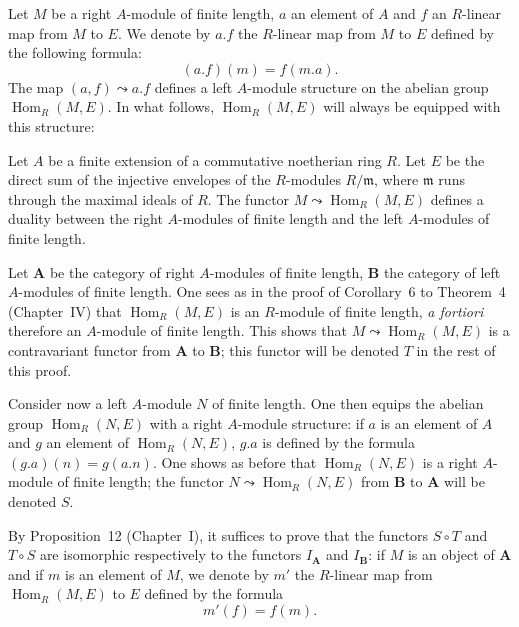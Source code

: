 Let $M$ be a right $A$-module of finite length, $a$ an element of $A$
and $f$ an $R$-linear map from $M$ to $E$. We denote by $a.f$ the
$R$-linear map from $M$ to $E$ defined by the following formula:
\[
(a.f)(m)=f(m.a).
\]
The map $(a,f)\leadsto a.f$ defines a left $A$-module structure on the
abelian group $\operatorname{Hom}_R(M,E)$. In what follows,
$\operatorname{Hom}_R(M,E)$ will always be equipped with this
structure:

\begin{proposition}
Let $A$ be a finite extension of a commutative noetherian ring $R$.
Let $E$ be the direct sum of the injective envelopes of the
$R$-modules $R/\mathfrak{m}$, where $\mathfrak{m}$ runs through the
maximal ideals of $R$. The functor
$M\leadsto\operatorname{Hom}_R(M,E)$ defines a duality between the
right $A$-modules of finite length and the left $A$-modules of finite
length.
\end{proposition}

Let $\mathbf{A}$ be the category of right $A$-modules of finite
length, $\mathbf{B}$ the category of left $A$-modules of finite length.
One sees as in the proof of Corollary~6 to Theorem~4 (Chapter~IV) that
$\operatorname{Hom}_R(M,E)$ is an $R$-module of finite length, \emph{a
fortiori} therefore an $A$-module of finite length. This shows that
$M\leadsto\operatorname{Hom}_R(M,E)$ is a contravariant functor from
$\mathbf{A}$ to $\mathbf{B}$; this functor will be denoted $T$ in the
rest of this proof.

Consider now a left $A$-module $N$ of finite length. One then equips
the abelian group $\operatorname{Hom}_R(N,E)$ with a right $A$-module
structure: if $a$ is an element of $A$ and $g$ an element of
$\operatorname{Hom}_R(N,E)$, $g.a$ is defined by the formula
$(g.a)(n)=g(a.n)$. One shows as before that $\operatorname{Hom}_R(N,E)$
is a right $A$-module of finite length; the functor
$N\leadsto\operatorname{Hom}_R(N,E)$ from $\mathbf{B}$ to $\mathbf{A}$
will be denoted $S$.

By Proposition~12 (Chapter~I), it suffices to prove that the functors
$S\circ T$ and $T\circ S$ are isomorphic respectively to the functors
$I_{\mathbf{A}}$ and $I_{\mathbf{B}}$: if $M$ is an object of
$\mathbf{A}$ and if $m$ is an element of $M$, we denote by $m'$ the
$R$-linear map from $\operatorname{Hom}_R(M,E)$ to $E$
defined by the formula
\[
m'(f)=f(m).
\]

